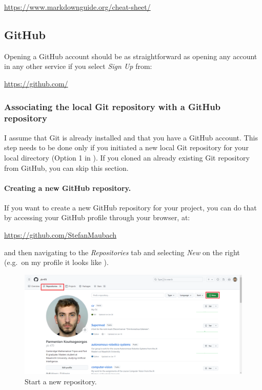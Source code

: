 \documentclass[a4paper,10pt]{article}
\begin{document}
\url{https://www.markdownguide.org/cheat-sheet/}


\subsection{GitHub}

Opening a GitHub account should be as straightforward as opening any account in any other service if you select \emph{Sign Up} from: 

\url{https://github.com/}


\subsubsection{Associating the local Git repository with a GitHub repository}

I assume that Git is already installed and that you have a GitHub account. This step needs to be done only if you initiated a new local Git repository for your local directory (Option 1 in ). If you cloned an already existing Git repository from GitHub, you can skip this section.

\paragraph{Creating a new GitHub repository.} If you want to create a new GitHub repository for your project, you can do that by accessing your GitHub profile through your browser, at:

\url{https://github.com/StefanMaubach}

and then navigating to the \emph{Repositories} tab and selecting \emph{New} on the right (e.g.\ on my profile it looks like ).

\begin{figure}[htbp]
    \centering
    \includegraphics[width=\textwidth]{new_repository.png}
    \caption{Start a new repository.}
    \label{fig:new_repository}   
\end{figure}
\end{document}

